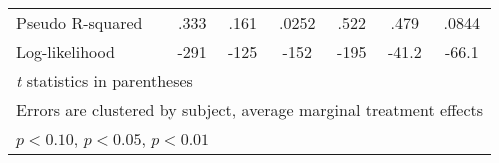 \begin{table}[htbp]
\begin{tabular}{l*{6}{c}}
Pseudo R-squared&     .333         &     .161         &    .0252         &     .522         &     .479         &    .0844         \\
Log-likelihood  &     -291         &     -125         &     -152         &     -195         &    -41.2         &    -66.1         \\
\hline\hline
\multicolumn{7}{l}{\footnotesize \textit{t} statistics in parentheses}\\
\multicolumn{7}{l}{\footnotesize Errors are clustered by subject, average marginal treatment effects}\\
\multicolumn{7}{l}{\footnotesize \sym{*} \(p<0.10\), \sym{**} \(p<0.05\), \sym{***} \(p<0.01\)}\\
\end{tabular}
\end{table}
